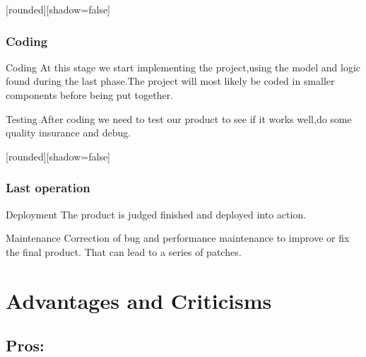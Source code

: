 \documentclass[10pt]{beamer}
\begin{document}
\begin{frame}
[rounded][shadow=false]
\frametitle{Coding}
\begin{block}{Coding}
At this stage we start implementing the project,using the model and logic found during the last phase.The project will most likely be coded in smaller components before being put together.
\end{block}

\begin{block}{Testing}
After coding we need to test our product to see if it works well,do some quality insurance and debug.
\end{block}
\end{frame}

\begin{frame}
[rounded][shadow=false]
\frametitle{Last operation}
\begin{block}{Deployment}
The product is judged finished and deployed into action.
\end{block}
\begin{block}{Maintenance}
Correction of bug and performance maintenance to improve or fix the final product. That can lead to a series of patches. 
\end{block}
    

\end{frame}



\section{Advantages and Criticisms}
\subsection{Pros:}
\end{document}
